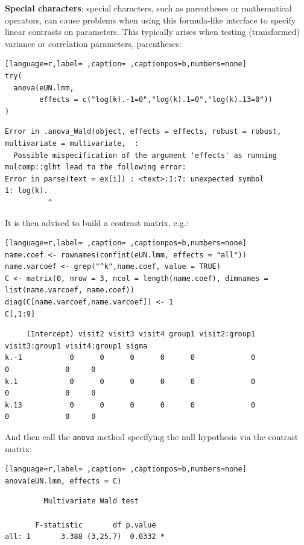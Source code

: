 \documentclass[12pt]{article}
\begin{document}
\textbf{Special characters}: special characters, such as parentheses or
mathematical operators, can cause problems when using this
formula-like interface to specify linear contrasts on parameters. This
typically arises when testing (transformed) variance or correlation parameters,
parentheses:
\begin{lstlisting}[language=r,label= ,caption= ,captionpos=b,numbers=none]
try(
  anova(eUN.lmm,
        effects = c("log(k).-1=0","log(k).1=0","log(k).13=0"))
)
\end{lstlisting}

\begin{verbatim}
Error in .anova_Wald(object, effects = effects, robust = robust, multivariate = multivariate,  : 
  Possible mispecification of the argument 'effects' as running mulcomp::glht lead to the following error: 
Error in parse(text = ex[i]) : <text>:1:7: unexpected symbol
1: log(k).
          ^
\end{verbatim}


It is then advised to build a contrast matrix, e.g.:
\begin{lstlisting}[language=r,label= ,caption= ,captionpos=b,numbers=none]
name.coef <- rownames(confint(eUN.lmm, effects = "all"))
name.varcoef <- grep("^k",name.coef, value = TRUE)
C <- matrix(0, nrow = 3, ncol = length(name.coef), dimnames = list(name.varcoef, name.coef))
diag(C[name.varcoef,name.varcoef]) <- 1
C[,1:9]
\end{lstlisting}

\begin{verbatim}
     (Intercept) visit2 visit3 visit4 group1 visit2:group1 visit3:group1 visit4:group1 sigma
k.-1           0      0      0      0      0             0             0             0     0
k.1            0      0      0      0      0             0             0             0     0
k.13           0      0      0      0      0             0             0             0     0
\end{verbatim}


And then call the \texttt{anova} method specifying the null hypothesis via the
contrast matrix:
\begin{lstlisting}[language=r,label= ,caption= ,captionpos=b,numbers=none]
anova(eUN.lmm, effects = C)
\end{lstlisting}

\begin{verbatim}
	     Multivariate Wald test 

       F-statistic       df p.value  
all: 1       3.388 (3,25.7)  0.0332 *
\end{verbatim}
\end{document}
